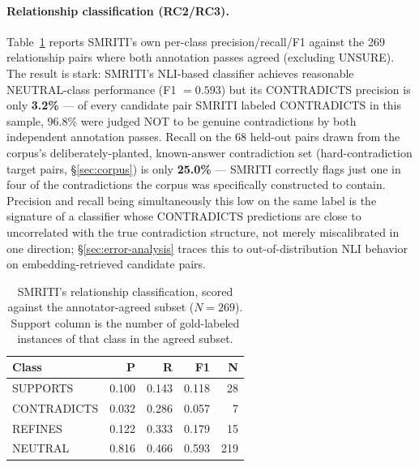 \paragraph{Relationship classification (RC2/RC3).} Table~\ref{tab:relprf1}
reports SMRITI's own per-class precision/recall/F1 against the 269
relationship pairs where both annotation passes agreed (excluding UNSURE).
The result is stark: SMRITI's NLI-based classifier achieves reasonable
NEUTRAL-class performance (F1 $=0.593$) but its CONTRADICTS precision is
only \textbf{3.2\%} --- of every candidate pair SMRITI labeled CONTRADICTS in
this sample, 96.8\% were judged NOT to be genuine contradictions by both
independent annotation passes. Recall on the 68 held-out pairs drawn from
the corpus's deliberately-planted, known-answer contradiction set
(hard-contradiction target pairs, \S\ref{sec:corpus}) is only
\textbf{25.0\%} --- SMRITI correctly flags just one in four of the
contradictions the corpus was specifically constructed to contain. Precision
and recall being simultaneously this low on the same label is the
signature of a classifier whose CONTRADICTS predictions are close to
uncorrelated with the true contradiction structure, not merely
miscalibrated in one direction; \S\ref{sec:error-analysis} traces this to
out-of-distribution NLI behavior on embedding-retrieved candidate pairs.

\begin{table}[t]
\centering
\small
\begin{tabular}{lrrrr}
\toprule
\textbf{Class} & \textbf{P} & \textbf{R} & \textbf{F1} & \textbf{N} \\
\midrule
SUPPORTS     & 0.100 & 0.143 & 0.118 & 28 \\
CONTRADICTS  & 0.032 & 0.286 & 0.057 & 7 \\
REFINES      & 0.122 & 0.333 & 0.179 & 15 \\
NEUTRAL      & 0.816 & 0.466 & 0.593 & 219 \\
\bottomrule
\end{tabular}
\caption{SMRITI's relationship classification, scored against the
annotator-agreed subset ($N=269$). Support column is the number of
gold-labeled instances of that class in the agreed subset.}
\label{tab:relprf1}
\end{table}

